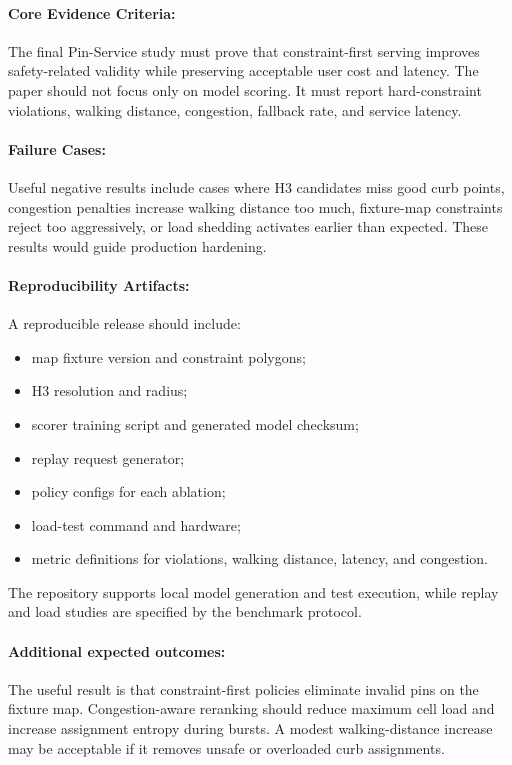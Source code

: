 \documentclass{article}
\begin{document}
\paragraph{Core Evidence Criteria:}

The final Pin-Service study must prove that constraint-first serving improves safety-related validity while preserving acceptable user cost and latency. The paper should not focus only on model scoring. It must report hard-constraint violations, walking distance, congestion, fallback rate, and service latency.

\paragraph{Failure Cases:}

Useful negative results include cases where H3 candidates miss good curb points, congestion penalties increase walking distance too much, fixture-map constraints reject too aggressively, or load shedding activates earlier than expected. These results would guide production hardening.

\paragraph{Reproducibility Artifacts:}

A reproducible release should include:
\begin{itemize}
  \item map fixture version and constraint polygons;
  \item H3 resolution and radius;
  \item scorer training script and generated model checksum;
  \item replay request generator;
  \item policy configs for each ablation;
  \item load-test command and hardware;
  \item metric definitions for violations, walking distance, latency, and congestion.
\end{itemize}
The repository supports local model generation and test execution, while replay and load studies are specified by the benchmark protocol.

\paragraph{Additional expected outcomes:}

The useful result is that constraint-first policies eliminate invalid pins on the fixture map. Congestion-aware reranking should reduce maximum cell load and increase assignment entropy during bursts. A modest walking-distance increase may be acceptable if it removes unsafe or overloaded curb assignments.
\end{document}
